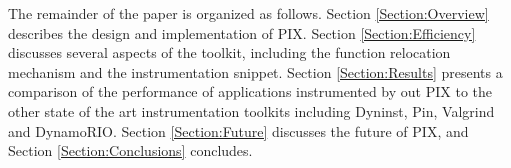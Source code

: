 The remainder of the paper is organized as follows. Section
\ref{Section:Overview} describes the design and implementation of PIX.
Section \ref{Section:Efficiency} discusses
several aspects of the toolkit, including the function relocation mechanism and the
instrumentation snippet. Section \ref{Section:Results}
presents a comparison of the performance of applications instrumented by out PIX to
the other state of the art instrumentation toolkits including Dyninst, Pin, Valgrind and DynamoRIO. Section
\ref{Section:Future} discusses the future of PIX, and Section \ref{Section:Conclusions} concludes.
